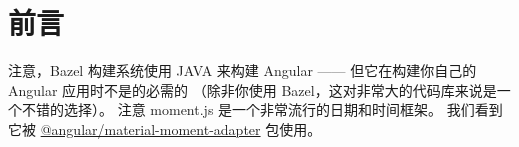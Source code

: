 \chapter{前言}


\indent
注意，Bazel 构建系统使用 JAVA 来构建 Angular —— 但它在构建你自己的 Angular 应用时不是的必需的
（除非你使用 Bazel，这对非常大的代码库来说是一个不错的选择）。
注意 moment.js 是一个非常流行的日期和时间框架。
我们看到它被 \href{https://github.com/angular/material2/tree/master/src/material-moment-adapter}{@angular/material-moment-adapter} 包使用。






